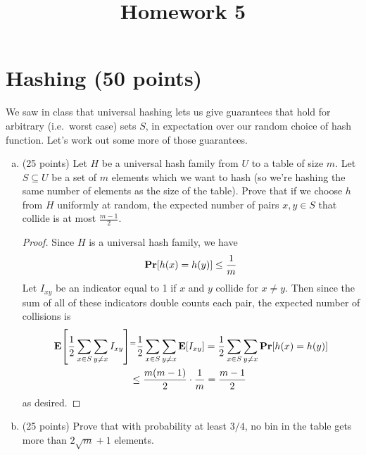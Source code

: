 \documentclass{article}
\newcommand{\prob}[1]{\ensuremath{\text{{\bf Pr}$\left[#1\right]$}}}
\newcommand{\expct}[1]{\ensuremath{\text{{\bf E}$\left[#1\right]$}}}
\begin{document}
\title{Homework 5}
\maketitle
\thispagestyle{fancy}

\section{Hashing (50 points)}
We saw in class that universal hashing lets us give guarantees that hold for arbitrary (i.e.~worst case) sets $S$, in expectation over our random choice of hash function.  Let's work out some more of those guarantees.

\begin{enumerate}[(a)]
	\item (25 points) Let $H$ be a universal hash family from $U$ to a table of size $m$.  Let $S \subseteq U$  be a set of $m$ elements which we want to hash (so we're hashing the same number of elements as the size of the table).  Prove that if we choose $h$ from $H$ uniformly at random, the expected number of pairs $x,y \in S$ that collide is at most $\frac{m-1}{2}$.  
		\begin{proof}
			Since $H$ is a universal hash family, we have
			\begin{align*}
				\prob {h(x)=h(y)}\le \frac{1}{m}
			\end{align*}
			Let $I_{xy}$ be an indicator equal to 1 if $x$ and $y$ collide for $x\neq y.$ Then since the sum of all of these indicators double counts each pair, the expected number of collisions is
			\begin{align*}
				\expct{\frac{1}{2}\sum_{x\in S}^{}\sum_{y\neq x}^{} I_{xy}} &^= \frac{1}{2}\sum_{x\in S}^{}\sum_{y\neq x}^{}\expct{I_{xy}} = \frac{1}{2}\sum_{x\in S}^{}\sum_{y\neq x}^{} \prob{h(x)=h(y)} \\
				&\le \frac{m(m-1)}{2}\cdot \frac{1}{m} = \frac{m-1}{2}
			\end{align*}
			as desired.
		\end{proof}

	\item (25 points) Prove that with probability at least $3/4$, no bin in the table gets more than $2\sqrt{m} + 1$ elements.  


\end{enumerate}
\end{document}
